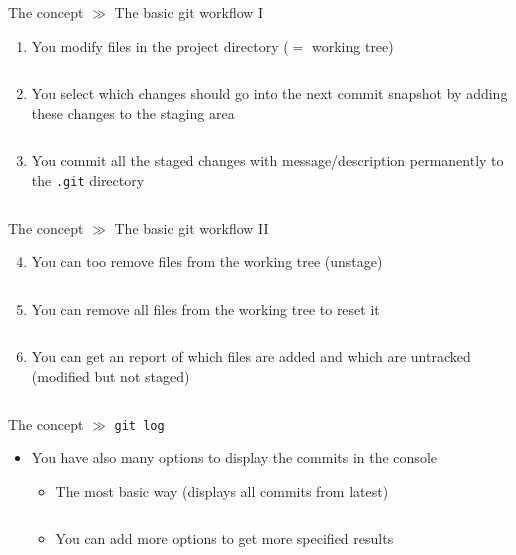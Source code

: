 \documentclass[10pt]{beamer}
\begin{document}
\begin{frame}{The concept $\gg$ The basic git workflow I}
	\begin{enumerate}
		\item You modify files in the project directory ($=$ working tree)
		\inputminted[bgcolor=lightGreyCustom,fontsize=\scriptsize]{sh}{./resources/git_workflow_01_modify.sh}
		\item You select which changes should go into the next commit snapshot by adding these changes to the staging area
		\inputminted[bgcolor=lightGreyCustom,fontsize=\scriptsize]{sh}{./resources/git_workflow_02_stage.sh}
		\item You commit all the staged changes with message/description permanently to the \texttt{.git} directory
		\inputminted[bgcolor=lightGreyCustom,fontsize=\scriptsize]{sh}{./resources/git_workflow_03_commit.sh}
	\end{enumerate}
\end{frame}

\begin{frame}{The concept $\gg$ The basic git workflow II}
	\begin{enumerate}\setcounter{enumi}{3}
		\item You can too remove files from the working tree (unstage)
		\inputminted[bgcolor=lightGreyCustom,fontsize=\scriptsize]{sh}{./resources/git_workflow_04_unstage.sh}
		\item You can remove all files from the working tree to reset it
		\inputminted[bgcolor=lightGreyCustom,fontsize=\scriptsize]{sh}{./resources/git_workflow_05_reset.sh}
		\item You can get an report of which files are added and which are untracked (modified but not staged)
		\inputminted[bgcolor=lightGreyCustom,fontsize=\scriptsize]{sh}{./resources/git_workflow_06_status.sh}
	\end{enumerate}
\end{frame}

\begin{frame}{The concept $\gg$ \texttt{git log}}
	\begin{itemize}
		\item You have also many options to display the commits in the console
		\begin{itemize}
			\item The most basic way (displays all commits from latest)
			\inputminted[bgcolor=lightGreyCustom,fontsize=\scriptsize]{sh}{./resources/git_log_01_normal.sh}
			\item You can add more options to get more specified results
			\inputminted[bgcolor=lightGreyCustom,fontsize=\scriptsize]{sh}{./resources/git_log_02_options.sh}
		\end{itemize}
	\end{itemize}
\end{frame}
\end{document}
